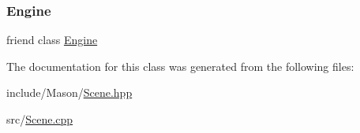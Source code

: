 \subsubsection{\texorpdfstring{Engine}{Engine}}
{\footnotesize\ttfamily friend class \hyperlink{class_mason_1_1_engine}{Engine}\hspace{0.3cm}{\ttfamily [friend]}}



The documentation for this class was generated from the following files\+:\begin{DoxyCompactItemize}
\item 
include/\+Mason/\hyperlink{_scene_8hpp}{Scene.\+hpp}\item 
src/\hyperlink{_scene_8cpp}{Scene.\+cpp}\end{DoxyCompactItemize}
